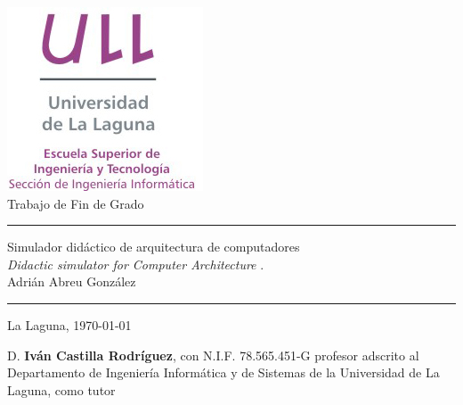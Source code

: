 \documentclass[spanish,a4paper,14pt,oneside]{extreport}
\begin{document}

\pagestyle{empty}
\thispagestyle{empty}


\newcommand{\HRule}{\rule{\linewidth}{1mm}}
\setlength{\parindent}{0mm}
\setlength{\parskip}{0mm}


\begin{center}
\includegraphics[scale=0.8]{images/logo_vertical}\\[10mm]
{\Huge Trabajo de Fin de Grado}
\end{center}

\HRule
\begin{flushright}
        {\Huge Simulador didáctico de arquitectura de computadores} \\[2.5mm]
        {\Large \textit{Didactic simulator for Computer Architecture} .} \\[5mm]
        {\Large Adrián Abreu González} \\[5mm]


\end{flushright}
\HRule
{}
\begin{center}
  \Large La Laguna, \today
\end{center}

\setlength{\parindent}{5mm}

\newpage
\thispagestyle{empty}

D. {\bf Iván Castilla Rodríguez}, con N.I.F. 78.565.451-G
profesor adscrito al Departamento
de Ingeniería Informática y de Sistemas
de la Universidad de La Laguna, como tutor
\end{document}
